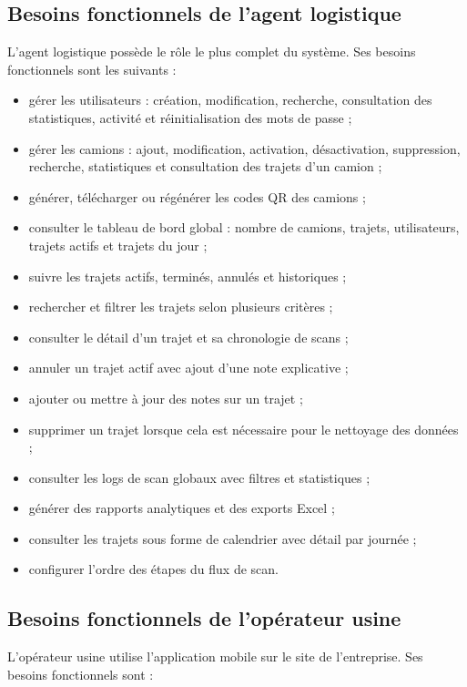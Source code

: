 \subsection{Besoins fonctionnels de l'agent logistique}

L'agent logistique possède le rôle le plus complet du système. Ses besoins fonctionnels sont les suivants :

\begin{itemize}
    \item gérer les utilisateurs : création, modification, recherche, consultation des statistiques, activité et réinitialisation des mots de passe ;
    \item gérer les camions : ajout, modification, activation, désactivation, suppression, recherche, statistiques et consultation des trajets d'un camion ;
    \item générer, télécharger ou régénérer les codes QR des camions ;
    \item consulter le tableau de bord global : nombre de camions, trajets, utilisateurs, trajets actifs et trajets du jour ;
    \item suivre les trajets actifs, terminés, annulés et historiques ;
    \item rechercher et filtrer les trajets selon plusieurs critères ;
    \item consulter le détail d'un trajet et sa chronologie de scans ;
    \item annuler un trajet actif avec ajout d'une note explicative ;
    \item ajouter ou mettre à jour des notes sur un trajet ;
    \item supprimer un trajet lorsque cela est nécessaire pour le nettoyage des données ;
    \item consulter les logs de scan globaux avec filtres et statistiques ;
    \item générer des rapports analytiques et des exports Excel ;
    \item consulter les trajets sous forme de calendrier avec détail par journée ;
    \item configurer l'ordre des étapes du flux de scan.
\end{itemize}

\subsection{Besoins fonctionnels de l'opérateur usine}

L'opérateur usine utilise l'application mobile sur le site de l'entreprise. Ses besoins fonctionnels sont :

